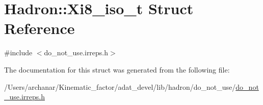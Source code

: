 \hypertarget{structHadron_1_1Xi8__iso__t}{}\section{Hadron\+:\+:Xi8\+\_\+iso\+\_\+t Struct Reference}
\label{structHadron_1_1Xi8__iso__t}


{\ttfamily \#include $<$do\+\_\+not\+\_\+use.\+irreps.\+h$>$}



The documentation for this struct was generated from the following file\+:\begin{DoxyCompactItemize}
\item 
/\+Users/archanar/\+Kinematic\+\_\+factor/adat\+\_\+devel/lib/hadron/do\+\_\+not\+\_\+use/\mbox{\hyperlink{do__not__use_8irreps_8h}{do\+\_\+not\+\_\+use.\+irreps.\+h}}\end{DoxyCompactItemize}
